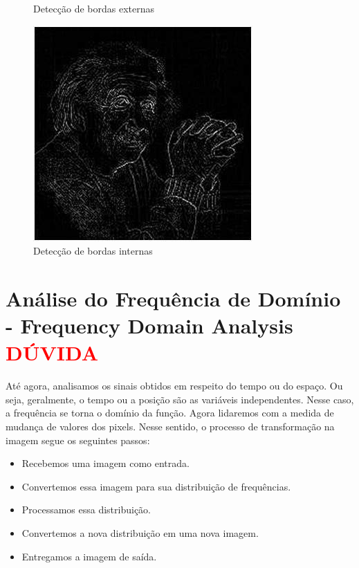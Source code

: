 \documentclass[a4paper, 12pt]{article}
\begin{document}
\begin{figure}[!htb]
		\caption{Detecção de bordas externas}
  	\endminipage\hspace{1cm}
	  	\includegraphics[width=\linewidth]{images/laplacian2.jpg}
	  	\caption{Detecção de bordas internas}
	\endminipage
\end{figure}
\section{Análise do Frequência de Domínio - Frequency Domain Analysis \textcolor{red}{DÚVIDA}}
Até agora, analisamos os sinais obtidos em respeito do tempo ou do espaço. Ou seja, geralmente, o tempo ou a posição são as variáveis independentes. 
Nesse caso, a frequência se torna o domínio da função. Agora lidaremos com a medida de mudança de valores dos pixels. Nesse sentido, 
o processo de transformação na imagem segue os seguintes passos:
\begin{itemize}
	\item Recebemos uma imagem como entrada.
 	\item Convertemos essa imagem para sua distribuição de frequências.
  	\item Processamos essa distribuição.
   	\item Convertemos a nova distribuição em uma nova imagem.
    \item Entregamos a imagem de saída.
\end{itemize}
\end{document}

